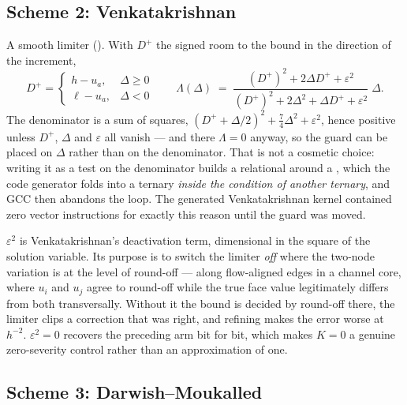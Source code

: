 \subsection{Scheme 2: Venkatakrishnan}

A smooth limiter (). With $D^{+}$ the signed room to the bound in the
direction of the increment,
\begin{equation}
D^{+} = \begin{cases} h - u_a, & \Delta \ge 0\\ \ell - u_a, & \Delta < 0\end{cases}
\qquad
\Lambda(\Delta) \;=\; \frac{(D^{+})^2 + 2\Delta D^{+} + \varepsilon^2}
                          {(D^{+})^2 + 2\Delta^2 + \Delta D^{+} + \varepsilon^2}\;\Delta .
\label{eq:venkat}
\end{equation}
The denominator is a sum of squares, $(D^{+} + \Delta/2)^2 + \tfrac74\Delta^2 + \varepsilon^2$,
hence positive unless $D^{+}$, $\Delta$ and $\varepsilon$ all vanish --- and there $\Lambda = 0$
anyway, so the guard can be placed on $\Delta$ rather than on the denominator. That is not a
cosmetic choice: writing it as a test on the denominator builds a relational around a
, which the code generator folds into a ternary \emph{inside the condition of
another ternary}, and GCC then abandons the loop. The generated Venkatakrishnan kernel contained
zero vector instructions for exactly this reason until the guard was moved.

$\varepsilon^2$ is Venkatakrishnan's deactivation term, dimensional in the square of the solution
variable. Its purpose is to switch the limiter \emph{off} where the two-node variation is at the
level of round-off --- along flow-aligned edges in a channel core, where $u_i$ and $u_j$ agree to
round-off while the true face value legitimately differs from both transversally. Without it the
bound is decided by round-off there, the limiter clips a correction that was right, and refining
makes the error worse at $h^{-2}$. $\varepsilon^2 = 0$ recovers the preceding arm bit for bit,
which makes $K=0$ a genuine zero-severity control rather than an approximation of one.

\subsection{Scheme 3: Darwish--Moukalled}


